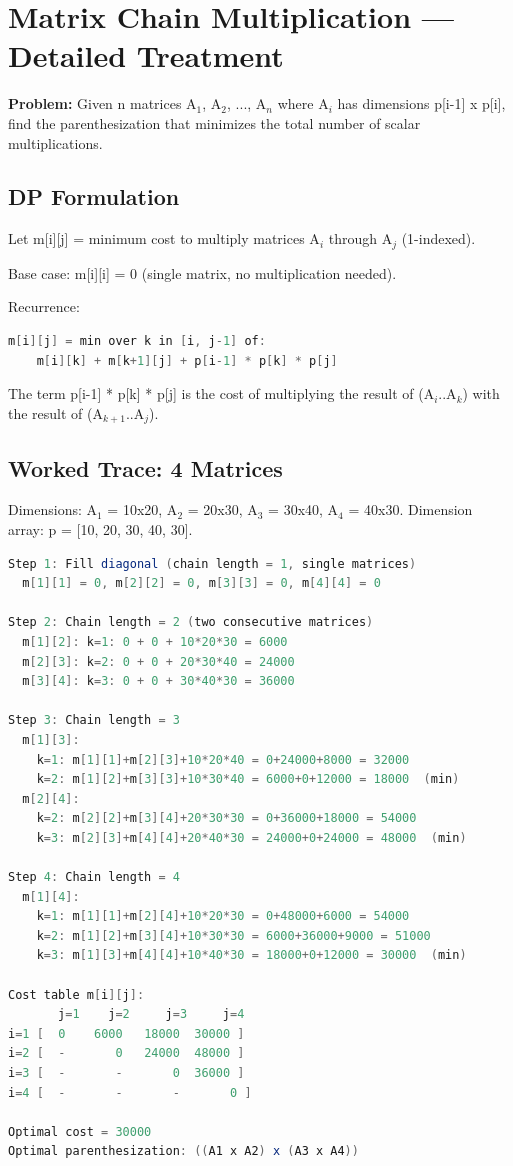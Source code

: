\section{Matrix Chain Multiplication --- Detailed Treatment}

\textbf{Problem:} Given n matrices A$_{1}$, A$_{2}$, ..., A$_{n}$ where A$_{i}$ has dimensions p[i-1] x p[i], find the parenthesization that minimizes the total number of scalar multiplications.

\subsection{DP Formulation}

Let m[i][j] = minimum cost to multiply matrices A$_{i}$ through A$_{j}$ (1-indexed).

Base case: m[i][i] = 0 (single matrix, no multiplication needed).

Recurrence:

\begin{lstlisting}[language=Java]
m[i][j] = min over k in [i, j-1] of:
    m[i][k] + m[k+1][j] + p[i-1] * p[k] * p[j]
\end{lstlisting}

The term p[i-1] * p[k] * p[j] is the cost of multiplying the result of (A$_{i}$..A$_{k}$) with the result of (A$_{k+1}$..A$_{j}$).

\subsection{Worked Trace: 4 Matrices}

Dimensions: A$_{1}$ = 10x20, A$_{2}$ = 20x30, A$_{3}$ = 30x40, A$_{4}$ = 40x30.
Dimension array: p = [10, 20, 30, 40, 30].

\begin{lstlisting}[language=Java]
Step 1: Fill diagonal (chain length = 1, single matrices)
  m[1][1] = 0, m[2][2] = 0, m[3][3] = 0, m[4][4] = 0

Step 2: Chain length = 2 (two consecutive matrices)
  m[1][2]: k=1: 0 + 0 + 10*20*30 = 6000
  m[2][3]: k=2: 0 + 0 + 20*30*40 = 24000
  m[3][4]: k=3: 0 + 0 + 30*40*30 = 36000

Step 3: Chain length = 3
  m[1][3]:
    k=1: m[1][1]+m[2][3]+10*20*40 = 0+24000+8000 = 32000
    k=2: m[1][2]+m[3][3]+10*30*40 = 6000+0+12000 = 18000  (min)
  m[2][4]:
    k=2: m[2][2]+m[3][4]+20*30*30 = 0+36000+18000 = 54000
    k=3: m[2][3]+m[4][4]+20*40*30 = 24000+0+24000 = 48000  (min)

Step 4: Chain length = 4
  m[1][4]:
    k=1: m[1][1]+m[2][4]+10*20*30 = 0+48000+6000 = 54000
    k=2: m[1][2]+m[3][4]+10*30*30 = 6000+36000+9000 = 51000
    k=3: m[1][3]+m[4][4]+10*40*30 = 18000+0+12000 = 30000  (min)

Cost table m[i][j]:
       j=1    j=2     j=3     j=4
i=1 [  0    6000   18000  30000 ]
i=2 [  -       0   24000  48000 ]
i=3 [  -       -       0  36000 ]
i=4 [  -       -       -       0 ]

Optimal cost = 30000
Optimal parenthesization: ((A1 x A2) x (A3 x A4))
\end{lstlisting}

